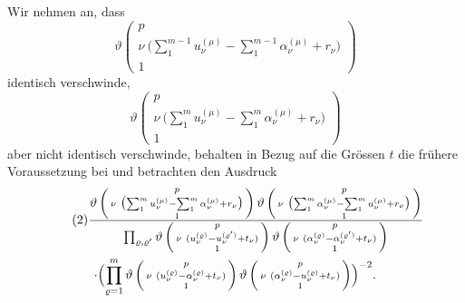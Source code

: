 \documentclass[12pt,a4paper]{article}
\begin{document}
Wir nehmen an, dass
\[ \vartheta\left(\begin{array}{c} p\\ \nu\ \bigl(\sum\limits_1^{m-1} u_\nu^{(\mu)} - \sum\limits_1^{m-1} \alpha_\nu^{(\mu)} + r_\nu\bigr)\\ 1 \end{array}\right) \]
identisch verschwinde,
\[ \vartheta\left(\begin{array}{c} p\\ \nu\ \bigl(\sum\limits_1^m u_\nu^{(\mu)} - \sum\limits_1^m \alpha_\nu^{(\mu)} + r_\nu\bigr)\\ 1 \end{array}\right) \]
aber nicht identisch verschwinde, behalten in Bezug auf die Grössen $t$ die frühere Voraussetzung bei und betrachten den Ausdruck
\begin{multline}
\tag{2}
\frac{\vartheta\left(\begin{smallmatrix} p\\ \nu\ \bigl(\sum_1^m u_\nu^{(\mu)} - \sum_1^m \alpha_\nu^{(\mu)} + r_\nu\bigr)\\ 1 \end{smallmatrix}\right)
\vartheta\left(\begin{smallmatrix} p\\ \nu\ \bigl(\sum_1^m \alpha_\nu^{(\mu)} - \sum_1^m u_\nu^{(\mu)} + r_\nu\bigr)\\ 1 \end{smallmatrix}\right)}{\prod_{\varrho,\varrho'}
\vartheta\left(\begin{smallmatrix} p\\ \nu\ (u_\nu^{(\varrho)} - u_\nu^{(\varrho')} + t_\nu)\\ 1 \end{smallmatrix}\right)
\vartheta\left(\begin{smallmatrix} p\\ \nu\ (\alpha_\nu^{(\varrho)} - \alpha_\nu^{(\varrho')} + t_\nu)\\ 1 \end{smallmatrix}\right)}\\
\cdot\Bigl(\prod_{\varrho=1}^m
\vartheta\left(\begin{smallmatrix} p\\ \nu\ (u_\nu^{(\varrho)} - \alpha_\nu^{(\varrho)} + t_\nu)\\ 1 \end{smallmatrix}\right)
\vartheta\left(\begin{smallmatrix} p\\ \nu\ (\alpha_\nu^{(\varrho)} - u_\nu^{(\varrho)} + t_\nu)\\ 1 \end{smallmatrix}\right)\Bigr)^{-2}.
\end{multline}
\end{document}
